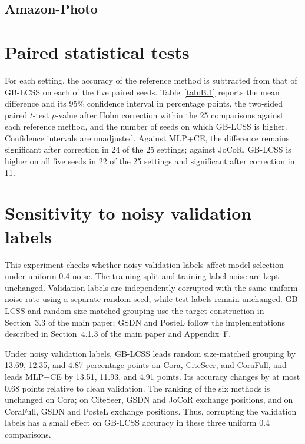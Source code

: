 \documentclass[10pt,letterpaper,nopreprintline]{elsarticle}
\begin{document}


\Needspace{120pt}

\subsection{Amazon-Photo}\label{sec:A.5}



\FloatBarrier

\setcounter{table}{0}

\section{Paired statistical tests}\label{sec:B}

For each setting, the accuracy of the reference method is subtracted from that of GB-LCSS on each of the five paired seeds. Table~\ref{tab:B.1} reports the mean difference and its 95\% confidence interval in percentage points, the two-sided paired \(t\)-test \(p\)-value after Holm correction within the 25 comparisons against each reference method, and the number of seeds on which GB-LCSS is higher. Confidence intervals are unadjusted. Against MLP+CE, the difference remains significant after correction in 24 of the 25 settings; against JoCoR, GB-LCSS is higher on all five seeds in 22 of the 25 settings and significant after correction in 11.



\FloatBarrier

\setcounter{table}{0}

\section{Sensitivity to noisy validation labels}\label{sec:C}

This experiment checks whether noisy validation labels affect model selection under uniform 0.4 noise. The training split and training-label noise are kept unchanged. Validation labels are independently corrupted with the same uniform noise rate using a separate random seed, while test labels remain unchanged. GB-LCSS and random size-matched grouping use the target construction in Section~3.3 of the main paper; GSDN and PosteL follow the implementations described in Section~4.1.3 of the main paper and Appendix~F.



Under noisy validation labels, GB-LCSS leads random size-matched grouping by 13.69, 12.35, and 4.87 percentage points on Cora, CiteSeer, and CoraFull, and leads MLP+CE by 13.51, 11.93, and 4.91 points. Its accuracy changes by at most 0.68 points relative to clean validation. The ranking of the six methods is unchanged on Cora; on CiteSeer, GSDN and JoCoR exchange positions, and on CoraFull, GSDN and PosteL exchange positions. Thus, corrupting the validation labels has a small effect on GB-LCSS accuracy in these three uniform 0.4 comparisons.
\end{document}
